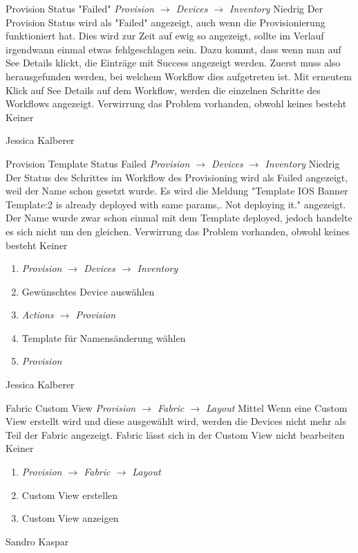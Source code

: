 \bugreport
{Provision Status "Failed"}
{\textit{ Provision $\rightarrow$ Devices $\rightarrow$ Inventory}}
{Niedrig}
{Der Provision Status wird als "Failed" angezeigt, auch wenn die Provisionierung funktioniert hat. Dies wird zur Zeit auf ewig so angezeigt, sollte im Verlauf irgendwann einmal etwas fehlgeschlagen sein. Dazu kommt, dass wenn man auf See Details klickt, die Einträge mit Success angezeigt werden. Zuerst muss also herausgefunden werden, bei welchem Workflow dies aufgetreten ist. Mit erneutem Klick auf See Details auf dem Workflow, werden die einzelnen Schritte des Workflows angezeigt.
}
{Verwirrung das Problem vorhanden, obwohl keines besteht}
{Keiner}
{
	
}
{Jessica Kalberer}
{}


\bugreport
{Provision Template Status Failed}
{\textit{ Provision $\rightarrow$ Devices $\rightarrow$ Inventory}}
{Niedrig}
{Der Status des Schrittes im Workflow des Provisioning wird als Failed angezeigt, weil der Name schon gesetzt wurde. Es wird die Meldung "Template IOS Banner Template:2 is already deployed with same params,. Not deploying it." angezeigt. Der Name wurde zwar schon einmal mit dem Template deployed, jedoch handelte es sich nicht um den gleichen.
}
{Verwirrung das Problem vorhanden, obwohl keines besteht}
{Keiner}
{
	\begin{enumerate}
		\item \textit{Provision $\rightarrow$ Devices $\rightarrow$ Inventory}
		\item Gewünschtes Device auswählen
		\item \textit{Actions $\rightarrow$ Provision}
		\item Template für Namensänderung wählen
		\item \textit{Provision}
	\end{enumerate}
}
{Jessica Kalberer}
{}

\bugreport
{Fabric Custom View}
{\textit{ Provision $\rightarrow$ Fabric $\rightarrow$ Layout}}
{Mittel}
{Wenn eine Custom View erstellt wird und diese ausgewählt wird, werden die Devices nicht mehr als Teil der Fabric angezeigt. 
}
{Fabric lässt sich in der Custom View nicht bearbeiten}
{Keiner}
{
	\begin{enumerate}
		\item \textit{Provision $\rightarrow$ Fabric $\rightarrow$ Layout}
		\item Custom View erstellen
		\item Custom View anzeigen
	\end{enumerate}
}
{Sandro Kaspar}
{}

